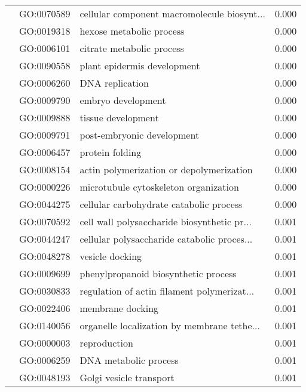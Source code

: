 \begin{longtable}{lllr}
   & GO:0070589 &  cellular component macromolecule biosynt... &         0.000 \\
   & GO:0019318 &                     hexose metabolic process &         0.000 \\
   & GO:0006101 &                    citrate metabolic process &         0.000 \\
   & GO:0090558 &                  plant epidermis development &         0.000 \\
   & GO:0006260 &                              DNA replication &         0.000 \\
   & GO:0009790 &                           embryo development &         0.000 \\
   & GO:0009888 &                           tissue development &         0.000 \\
   & GO:0009791 &                   post-embryonic development &         0.000 \\
   & GO:0006457 &                              protein folding &         0.000 \\
   & GO:0008154 &     actin polymerization or depolymerization &         0.000 \\
   & GO:0000226 &        microtubule cytoskeleton organization &         0.000 \\
   & GO:0044275 &      cellular carbohydrate catabolic process &         0.000 \\
   & GO:0070592 &  cell wall polysaccharide biosynthetic pr... &         0.001 \\
   & GO:0044247 &  cellular polysaccharide catabolic proces... &         0.001 \\
   & GO:0048278 &                              vesicle docking &         0.001 \\
   & GO:0009699 &         phenylpropanoid biosynthetic process &         0.001 \\
   & GO:0030833 &  regulation of actin filament polymerizat... &         0.001 \\
   & GO:0022406 &                             membrane docking &         0.001 \\
   & GO:0140056 &  organelle localization by membrane tethe... &         0.001 \\
   & GO:0000003 &                                 reproduction &         0.001 \\
   & GO:0006259 &                        DNA metabolic process &         0.001 \\
   & GO:0048193 &                      Golgi vesicle transport &         0.001 \\

\end{longtable}
